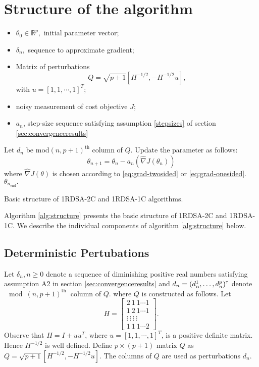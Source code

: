 \documentclass[letterpaper, 10 pt, conference]{ieeeconf}  %
\begin{document}
\section{Structure of the algorithm}
\label{sec:algo}
\begin{algorithm}[t]
\begin{algorithmic}
\begin{itemize}
 \item $\theta_0 \in \mathbb{R}^p,$ initial parameter vector;
 \item $\delta_n,$ sequence to approximate gradient;
 \item Matrix of perturbations $$Q=\sqrt{p+1}[H^{-1/2},-H^{-1/2}u],$$ 
 with $u=[1,1,\cdots,1]^T;$
 \item noisy measurement of cost objective $J$;
 \item $a_n$, step-size sequence satisfying assumption \eqref{stepsizes} of 
 section \ref{sec:convergenceresults}
\end{itemize}

	\State Let $d_n$ be mod$(n,p+1)^{\text{th}}$ column of $Q$. 
	\State Update the parameter as follows:
  \begin{equation}
  \theta_{n+1}=\theta_n-a_n(\widehat\nabla J(\theta_n)) \label{eq:algo}
  \end{equation}
where $\widehat\nabla J(\theta)$ is chosen according to \eqref{eq:grad-twosided} 
or \eqref{eq:grad-onesided}. 
\EndFor
{} $\theta_{n_{\text{end}}}.$
\end{algorithmic}
\caption{Basic structure of 1RDSA-2C and 1RDSA-1C algorithms.}
\label{alg:structure}
\end{algorithm}

Algorithm \ref{alg:structure} presents the basic structure of 
1RDSA-2C and 1RDSA-1C. We describe the individual 
components of algorithm \ref{alg:structure} below.
\subsection{Deterministic Pertubations}
Let $\delta_n, n\geq 0$ denote a sequence of diminishing positive real numbers satisfying 
assumption A2 in section \ref{sec:convergenceresults} and 
$d_n = (d_n^1,\ldots,d_n^p)^\mathsf{\scriptscriptstyle T}$ denote $\mod(n,p+1)^{\text{th }}$ column of $Q.$
where $Q$ is constructed as follows. 
Let \begin{equation*} H = \left[\begin{array}{cccc}
2 \ 1 \ 1 \cdots 1\\ 
1 \ 2 \ 1 \cdots 1 \\
\vdots \ \vdots \ \vdots \ \vdots\\
1 \ 1 \ 1 \cdots 2
\end{array}\right].
\end{equation*}
Observe that $H=I+uu^T$, where $u=[1,1,\cdots,1]^T$, is a positive definite matrix. Hence $H^{-1/2}$ is well defined.
Define $p\times (p+1)$ matrix $Q$ as $Q=\sqrt{p+1}[H^{-1/2},-H^{-1/2}u].$ The columns of
$Q$ are used as perturbations $d_n.$
\end{document}
